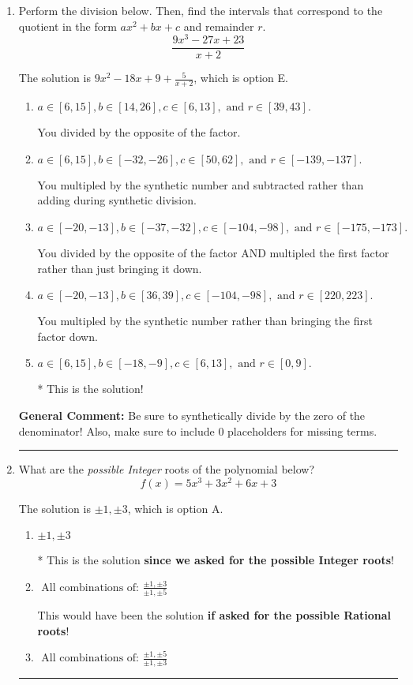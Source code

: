 \documentclass{extbook}[14pt]
\newcommand{\litem}[1]{\item #1

\rule{\textwidth}{0.4pt}}
\begin{document}
\begin{enumerate}\litem{
Perform the division below. Then, find the intervals that correspond to the quotient in the form $ax^2+bx+c$ and remainder $r$.
\[ \frac{9x^{3} -27 x + 23}{x + 2} \]

The solution is \( 9x^{2} -18 x + 9 + \frac{5}{x + 2} \), which is option E.\begin{enumerate}[label=\Alph*.]
\item \( a \in [6, 15], b \in [14, 26], c \in [6, 13], \text{ and } r \in [39, 43]. \)

 You divided by the opposite of the factor.
\item \( a \in [6, 15], b \in [-32, -26], c \in [50, 62], \text{ and } r \in [-139, -137]. \)

 You multipled by the synthetic number and subtracted rather than adding during synthetic division.
\item \( a \in [-20, -13], b \in [-37, -32], c \in [-104, -98], \text{ and } r \in [-175, -173]. \)

 You divided by the opposite of the factor AND multipled the first factor rather than just bringing it down.
\item \( a \in [-20, -13], b \in [36, 39], c \in [-104, -98], \text{ and } r \in [220, 223]. \)

 You multipled by the synthetic number rather than bringing the first factor down.
\item \( a \in [6, 15], b \in [-18, -9], c \in [6, 13], \text{ and } r \in [0, 9]. \)

* This is the solution!
\end{enumerate}

\textbf{General Comment:} Be sure to synthetically divide by the zero of the denominator! Also, make sure to include 0 placeholders for missing terms.
}
\litem{
What are the \textit{possible Integer} roots of the polynomial below?
\[ f(x) = 5x^{3} +3 x^{2} +6 x + 3 \]

The solution is \( \pm 1,\pm 3 \), which is option A.\begin{enumerate}[label=\Alph*.]
\item \( \pm 1,\pm 3 \)

* This is the solution \textbf{since we asked for the possible Integer roots}!
\item \( \text{ All combinations of: }\frac{\pm 1,\pm 3}{\pm 1,\pm 5} \)

This would have been the solution \textbf{if asked for the possible Rational roots}!
\item \( \text{ All combinations of: }\frac{\pm 1,\pm 5}{\pm 1,\pm 3} \)


\end{enumerate}}
\end{enumerate}
\end{document}
